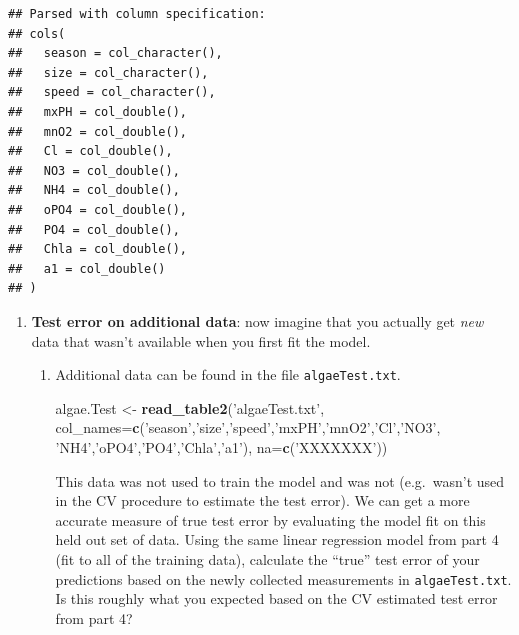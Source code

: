 \documentclass[]{article}
\newenvironment{Shaded}{\begin{snugshade}}{\end{snugshade}}
\newcommand{\KeywordTok}[1]{\textcolor[rgb]{0.13,0.29,0.53}{\textbf{#1}}}
\newcommand{\DataTypeTok}[1]{\textcolor[rgb]{0.13,0.29,0.53}{#1}}
\newcommand{\StringTok}[1]{\textcolor[rgb]{0.31,0.60,0.02}{#1}}
\newcommand{\NormalTok}[1]{#1}
\begin{document}
\begin{verbatim}
## Parsed with column specification:
## cols(
##   season = col_character(),
##   size = col_character(),
##   speed = col_character(),
##   mxPH = col_double(),
##   mnO2 = col_double(),
##   Cl = col_double(),
##   NO3 = col_double(),
##   NH4 = col_double(),
##   oPO4 = col_double(),
##   PO4 = col_double(),
##   Chla = col_double(),
##   a1 = col_double()
## )
\end{verbatim}

\begin{enumerate}
\def\labelenumi{\arabic{enumi}.}
\setcounter{enumi}{4}
\item
  \textbf{Test error on additional data}: now imagine that you actually
  get \emph{new} data that wasn't available when you first fit the
  model.

  \begin{enumerate}
  \item
    Additional data can be found in the file \texttt{algaeTest.txt}.

\begin{Shaded}
\begin{Highlighting}[]
\NormalTok{algae.Test <-}\StringTok{ }\KeywordTok{read_table2}\NormalTok{(}\StringTok{'algaeTest.txt'}\NormalTok{,}
                    \DataTypeTok{col_names=}\KeywordTok{c}\NormalTok{(}\StringTok{'season'}\NormalTok{,}\StringTok{'size'}\NormalTok{,}\StringTok{'speed'}\NormalTok{,}\StringTok{'mxPH'}\NormalTok{,}\StringTok{'mnO2'}\NormalTok{,}\StringTok{'Cl'}\NormalTok{,}\StringTok{'NO3'}\NormalTok{,}
                                \StringTok{'NH4'}\NormalTok{,}\StringTok{'oPO4'}\NormalTok{,}\StringTok{'PO4'}\NormalTok{,}\StringTok{'Chla'}\NormalTok{,}\StringTok{'a1'}\NormalTok{),}
                    \DataTypeTok{na=}\KeywordTok{c}\NormalTok{(}\StringTok{'XXXXXXX'}\NormalTok{))}
\end{Highlighting}
\end{Shaded}

    This data was not used to train the model and was not (e.g.~wasn't
    used in the CV procedure to estimate the test error). We can get a
    more accurate measure of true test error by evaluating the model fit
    on this held out set of data. Using the same linear regression model
    from part 4 (fit to all of the training data), calculate the
    ``true'' test error of your predictions based on the newly collected
    measurements in \texttt{algaeTest.txt}. Is this roughly what you
    expected based on the CV estimated test error from part 4?
  \end{enumerate}
\end{enumerate}
\end{document}
